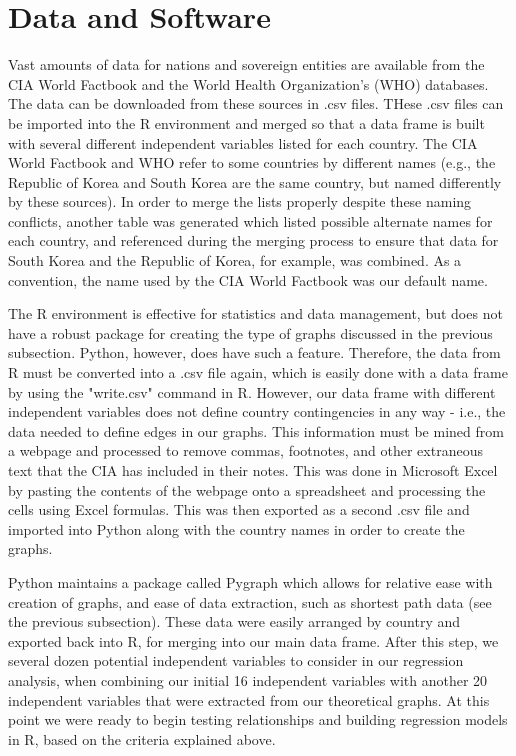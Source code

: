 \documentclass[oneside,12pt]{report}
\begin{document}
\section*{Data and Software}

Vast amounts of data for nations and sovereign entities are available from the CIA World Factbook and the World Health Organization's (WHO) databases. The data can be downloaded from these sources in .csv files. THese .csv files can be imported into the R environment and merged so that a data frame is built with several different independent variables listed for each country. The CIA World Factbook and WHO refer to some countries by different names (e.g., the Republic of Korea and South Korea are the same country, but named differently by these sources). In order to merge the lists properly despite these naming conflicts, another table was generated which listed possible alternate names for each country, and referenced during the merging process to ensure that data for South Korea and the Republic of Korea, for example, was combined. As a convention, the name used by the CIA World Factbook was our default name.

The R environment is effective for statistics and data management, but does not have a robust package for creating the type of graphs discussed in the previous subsection. Python, however, does have such a feature. Therefore, the data from R must be converted into a .csv file again, which is easily done with a data frame by using the "write.csv" command in R. However, our data frame with different independent variables does not define country contingencies in any way - i.e., the data needed to define edges in our graphs. This information must be mined from a webpage and processed to remove commas, footnotes, and other extraneous text that the CIA has included in their notes. This was done in Microsoft Excel by pasting the contents of the webpage onto a spreadsheet and processing the cells using Excel formulas. This was then exported as a second .csv file and imported into Python along with the country names in order to create the graphs.

Python maintains a package called Pygraph which allows for relative ease with creation of graphs, and ease of data extraction, such as shortest path data (see the previous subsection). These data were easily arranged by country and exported back into R, for merging into our main data frame. After this step, we several dozen potential independent variables to consider in our regression analysis, when combining our initial 16 independent variables with another 20 independent variables that were extracted from our theoretical graphs. At this point we were ready to begin testing relationships and building regression models in R, based on the criteria explained above.
\end{document}
